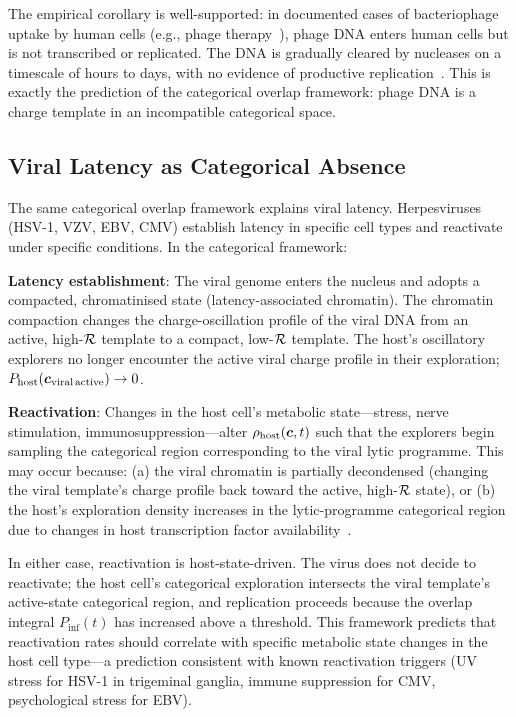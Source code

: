 The empirical corollary is well-supported: in documented cases of bacteriophage uptake by human cells (e.g., phage therapy~\cite{Schooley2017,Gorski2012}), phage DNA enters human cells but is not transcribed or replicated. The DNA is gradually cleared by nucleases on a timescale of hours to days, with no evidence of productive replication~\cite{Barr2013,Nguyen2017}. This is exactly the prediction of the categorical overlap framework: phage DNA is a charge template in an incompatible categorical space.

\subsection{Viral Latency as Categorical Absence}

The same categorical overlap framework explains viral latency. Herpesviruses (HSV-1, VZV, EBV, CMV) establish latency in specific cell types and reactivate under specific conditions. In the categorical framework:

\textbf{Latency establishment}: The viral genome enters the nucleus and adopts a compacted, chromatinised state (latency-associated chromatin). The chromatin compaction changes the charge-oscillation profile of the viral DNA from an active, high-$\mathcal{R}$ template to a compact, low-$\mathcal{R}$ template. The host's oscillatory explorers no longer encounter the active viral charge profile in their exploration; $P_{\mathrm{host}}(\boldsymbol{c}_{\mathrm{viral\,active}}) \rightarrow 0$.

\textbf{Reactivation}: Changes in the host cell's metabolic state---stress, nerve stimulation, immunosuppression---alter $\rho_{\mathrm{host}}(\boldsymbol{c}, t)$ such that the explorers begin sampling the categorical region corresponding to the viral lytic programme. This may occur because: (a) the viral chromatin is partially decondensed (changing the viral template's charge profile back toward the active, high-$\mathcal{R}$ state), or (b) the host's exploration density increases in the lytic-programme categorical region due to changes in host transcription factor availability~\cite{Nicoll2012,Siliciano2011}.

In either case, reactivation is host-state-driven. The virus does not decide to reactivate; the host cell's categorical exploration intersects the viral template's active-state categorical region, and replication proceeds because the overlap integral $P_{\mathrm{inf}}(t)$ has increased above a threshold. This framework predicts that reactivation rates should correlate with specific metabolic state changes in the host cell type---a prediction consistent with known reactivation triggers (UV stress for HSV-1 in trigeminal ganglia, immune suppression for CMV, psychological stress for EBV).

